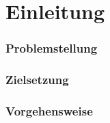
\chapter{Einleitung}


\subsection{Problemstellung}


\subsection{Zielsetzung}


\subsection{Vorgehensweise}
